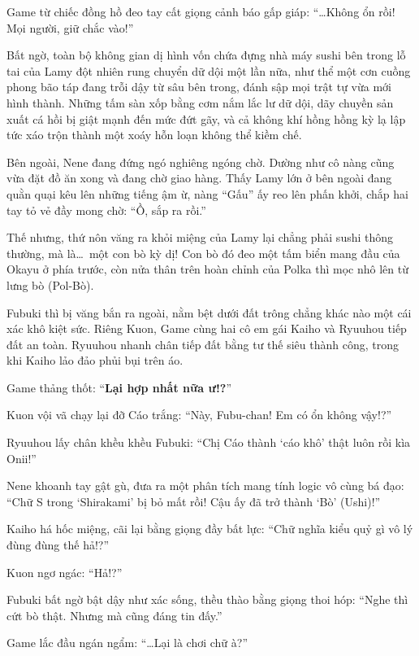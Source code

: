 \documentclass[../main.tex]{subfiles}
\begin{document}
Game từ chiếc đồng hồ đeo tay cất giọng cảnh báo gấp giáp: ``\dots Không ổn rồi! Mọi người, giữ chắc vào!''

Bất ngờ, toàn bộ không gian dị hình vốn chứa đựng nhà máy sushi bên trong lỗ tai của Lamy đột nhiên rung chuyển dữ dội một lần nữa, như thể một cơn cuồng phong bão táp đang trỗi dậy từ sâu bên trong, đánh sập mọi trật tự vừa mới hình thành. Những tấm sàn xốp bằng cơm nắm lắc lư dữ dội, dãy chuyền sản xuất cá hồi bị giật mạnh đến mức đứt gãy, và cả không khí hồng hồng kỳ lạ lập tức xáo trộn thành một xoáy hỗn loạn không thể kiềm chế.

\ct

Bên ngoài, Nene đang đứng ngó nghiêng ngóng chờ. Dường như cô nàng cũng vừa đặt đồ ăn xong và đang chờ giao hàng. Thấy Lamy lớn ở bên ngoài đang quằn quại kêu lên những tiếng ậm ừ, nàng ``Gấu'' ấy reo lên phấn khởi, chắp hai tay tỏ vẻ đầy mong chờ: ``Ồ, sắp ra rồi.''

Thế nhưng, thứ nôn văng ra khỏi miệng của Lamy lại chẳng phải sushi thông thường, mà là\dots\ một con bò kỳ dị! Con bò đó đeo một tấm biển mang đầu của Okayu ở phía trước, còn nửa thân trên hoàn chỉnh của Polka thì mọc nhô lên từ lưng bò (Pol-Bò).

Fubuki thì bị văng bắn ra ngoài, nằm bệt dưới đất trông chẳng khác nào một cái xác khô kiệt sức. Riêng Kuon, Game cùng hai cô em gái Kaiho và Ryuuhou tiếp đất an toàn. Ryuuhou nhanh chân tiếp đất bằng tư thế siêu thành công, trong khi Kaiho lảo đảo phủi bụi trên áo.


Game thảng thốt: ``\textbf{Lại hợp nhất nữa ư!?}''

Kuon vội vã chạy lại đỡ Cáo trắng: ``Này, Fubu-chan! Em có ổn không vậy!?''

Ryuuhou lấy chân khều khều Fubuki: ``Chị Cáo thành `cáo khô' thật luôn rồi kìa Onii!''

Nene khoanh tay gật gù, đưa ra một phân tích mang tính logic vô cùng bá đạo: ``Chữ S trong `Shirakami' bị bỏ mất rồi! Cậu ấy đã trở thành `Bò' (Ushi)!''

Kaiho há hốc miệng, cãi lại bằng giọng đầy bất lực: ``Chữ nghĩa kiểu quỷ gì vô lý đùng đùng thế hả!?''

Kuon ngơ ngác: ``Hả!?''

Fubuki bất ngờ bật dậy như xác sống, thều thào bằng giọng thoi hóp: ``Nghe thì cứt bò thật. Nhưng mà cũng đáng tin đấy.''

Game lắc đầu ngán ngẩm: ``\dots Lại là chơi chữ à?''
\end{document}
